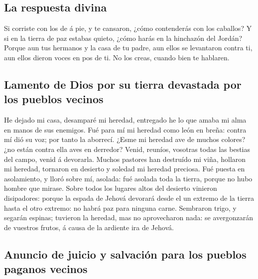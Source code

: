 \hypertarget{la-respuesta-divina}{%
\subsection{La respuesta divina}\label{la-respuesta-divina}}

 Si corriste con los de á pie, y te cansaron, ¿cómo
contenderás con los caballos? Y si en la tierra de paz estabas quieto,
¿cómo harás en la hinchazón del Jordán?  Porque aun tus
hermanos y la casa de tu padre, aun ellos se levantaron contra ti, aun
ellos dieron voces en pos de ti. No los creas, cuando bien te hablaren.

\hypertarget{lamento-de-dios-por-su-tierra-devastada-por-los-pueblos-vecinos}{%
\subsection{Lamento de Dios por su tierra devastada por los pueblos
vecinos}\label{lamento-de-dios-por-su-tierra-devastada-por-los-pueblos-vecinos}}

 He dejado mi casa, desamparé mi heredad, entregado he lo
que amaba mi alma en manos de sus enemigos.  Fué para mí
mi heredad como león en breña: contra mí dió su voz; por tanto la
aborrecí.  ¿Esme mi heredad ave de muchos colores? ¿no
están contra ella aves en derredor? Venid, reuníos, vosotras todas las
bestias del campo, venid á devorarla.  Muchos pastores
han destruído mi viña, hollaron mi heredad, tornaron en desierto y
soledad mi heredad preciosa.  Fué puesta en asolamiento,
y lloró sobre mí, asolada: fué asolada toda la tierra, porque no hubo
hombre que mirase.  Sobre todos los lugares altos del
desierto vinieron disipadores: porque la espada de Jehová devorará desde
el un extremo de la tierra hasta el otro extremo: no habrá paz para
ninguna carne.  Sembraron trigo, y segarán espinas;
tuvieron la heredad, mas no aprovecharon nada: se avergonzarán de
vuestros frutos, á causa de la ardiente ira de Jehová.

\hypertarget{anuncio-de-juicio-y-salvaciuxf3n-para-los-pueblos-paganos-vecinos}{%
\subsection{Anuncio de juicio y salvación para los pueblos paganos
vecinos}\label{anuncio-de-juicio-y-salvaciuxf3n-para-los-pueblos-paganos-vecinos}}

